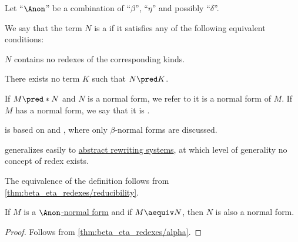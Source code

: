 \begin{definition}\label{def:lambda_term_normal_form}\mimprovised
  Let \enquote{\( {\Anon} \)} be a combination of \enquote{\( \beta \)}, \enquote{\( \eta \)} and possibly \enquote{\( \delta \)}.

  We say that the term \( N \) is a  if it satisfies any of the following equivalent conditions:
  \begin{thmenum}
     \( N \) contains no redexes of the corresponding kinds.

     There exists no term \( K \) such that \( N \pred K \).
  \end{thmenum}

  If \( M \pred* N \) and \( N \) is a normal form, we refer to it is a normal form of \( M \). If \( M \) has a normal form, we say that it is .
\end{definition}
\begin{comments}
  \item {} is based on \cite[def. 2.1.34]{Barendregt1984LambdaCalculus} and \cite[def. 1B6]{Hindley1997BasicSTT}, where only \( \beta \)-normal forms are discussed.

  \item {} generalizes easily to \hyperref[def:rewriting_system]{abstract rewriting systems}, at which level of generality no concept of redex exists.
\end{comments}
\begin{defproof}
  The equivalence of the definition follows from \cref{thm:beta_eta_redexes/reducibility}.
\end{defproof}

\begin{proposition}\label{thm:alpha_equivalent_normal_form}
  If \( M \) is a \hyperref[def:lambda_term_normal_form]{\( \Anon \)-normal form} and if \( M \aequiv N \), then \( N \) is also a normal form.
\end{proposition}
\begin{proof}
  Follows from \cref{thm:beta_eta_redexes/alpha}.
\end{proof}


